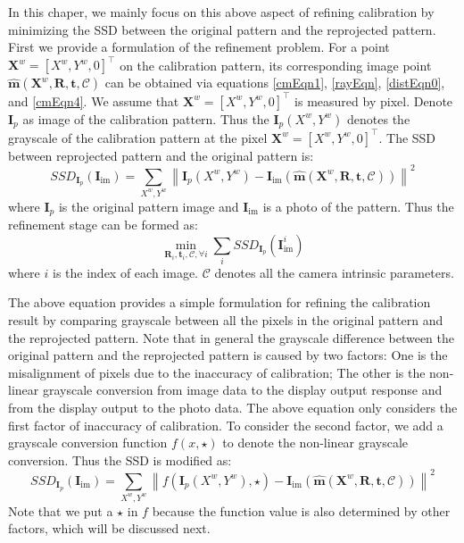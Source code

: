 \documentclass{report}
\begin{document}
In this chaper, we mainly focus on this above aspect of refining calibration by minimizing the SSD between the original pattern and the reprojected pattern. First we provide a formulation of the refinement problem. For a point $\mathbf{X}^w = [X^w, Y^w, 0]^\top$ on the calibration pattern, its corresponding image point $\hat{\mathbf{m}}(\mathbf{X}^w, \mathbf{R}, \mathbf{t}, \mathcal{C})$ can be obtained via equations \ref{cmEqn1}, \ref{rayEqn}, \ref{distEqn0}, and \ref{cmEqn4}. We assume that $\mathbf{X}^w = [X^w, Y^w, 0]^\top$ is measured by pixel. Denote $\mathbf{I}_p$ as image of the calibration pattern. Thus the $\mathbf{I}_p(X^w, Y^w)$ denotes the grayscale of the calibration pattern at the pixel $\mathbf{X}^w = [X^w, Y^w, 0]^\top$. The SSD between reprojected pattern and the original pattern is: 
\begin{equation}
SSD_{\mathbf{I}_p}(\mathbf{I}_\text{im}) = \sum_{X^w, Y^w} \left\|\mathbf{I}_p(X^w, Y^w) - \mathbf{I}_\text{im}(\hat{\mathbf{m}}(\mathbf{X}^w, \mathbf{R}, \mathbf{t}, \mathcal{C}))\right\|^2
\end{equation}
where $\mathbf{I}_p$ is the original pattern image and $\mathbf{I}_\text{im}$ is a photo of the pattern. Thus the refinement stage can be formed as: 
\begin{equation}
\min_{\mathbf{R}_i, \mathbf{t}_i, \mathcal{C}, \forall i} \sum_{i} SSD_{\mathbf{I}_p}(\mathbf{I}_\text{im}^i)
\label{SSDObjEqn}
\end{equation}
where $i$ is the index of each image. $\mathcal{C}$ denotes all the camera intrinsic parameters. 

The above equation provides a simple formulation for refining the calibration result by comparing grayscale between all the pixels in the original pattern and the reprojected pattern. Note that in general the grayscale difference between the original pattern and the reprojected pattern is caused by two factors: One is the misalignment of pixels due to the inaccuracy of calibration; The other is the non-linear grayscale conversion from image data to the display output response and from the display output to the photo data. The above equation only considers the first factor of inaccuracy of calibration. To consider the second factor, we add a grayscale conversion function $f(x, \star)$ to denote the non-linear grayscale conversion. Thus the SSD is modified as: 
\begin{equation}
SSD_{\mathbf{I}_p}(\mathbf{I}_\text{im}) = \sum_{X^w, Y^w} \left\| f\left( \mathbf{I}_p(X^w, Y^w), \star \right) - \mathbf{I}_\text{im}\left(\hat{\mathbf{m}}(\mathbf{X}^w, \mathbf{R}, \mathbf{t}, \mathcal{C})\right)\right\|^2\label{newSSDEqn}
\end{equation}
Note that we put a $\star$ in $f$ because the function value is also determined by other factors, which will be discussed next. 
\end{document}
